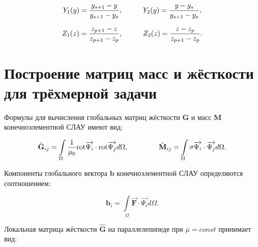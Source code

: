 \begin{equation*} \label{eq_2_38}
	Y_1(y) = \frac{y_{s + 1} - y}{y_{s + 1} - y_s}, \hspace{10mm} Y_2(y) = \frac{y - y_s}{y_{s + 1} - y_s},
\end{equation*}

\begin{equation*} \label{eq_2_39}
	Z_1(z) = \frac{z_{p + 1} - z}{z_{p + 1} - z_p}, \hspace{10mm} Z_2(z) = \frac{z - z_p}{z_{p + 1} - z_p}.
\end{equation*}

\section{Построение матриц масс и жёсткости для трёхмерной задачи}

Формулы для вычисления глобальных матриц жёсткости $\textbf{G}$ и масс $\textbf{M}$ конечноэлементной СЛАУ имеют вид:

\begin{equation*} \label{eq_2_40}
	\hat{\textbf{G}}_{ij} = \int \limits_{\Omega} \frac{1}{\mu_0} \text{rot} \overrightarrow{\textbf{$\Psi_i$}} \cdot \text{rot} \overrightarrow{\textbf{$\Psi_j$}} d \Omega, \hspace{15mm} \hat{\textbf{M}}_{ij} = \int \limits_{\Omega} \sigma \overrightarrow{\textbf{$\Psi_i$}} \cdot \overrightarrow{\textbf{$\Psi_j$}} d \Omega.
\end{equation*}

Компоненты глобального вектора $\textbf{b}$ конечноэлементной СЛАУ определяются соотношением:

\begin{equation*} \label{eq_2_41}
	\textbf{b}_{i} = \int \limits_{\Omega} \overrightarrow{\textbf{F}} \cdot \overrightarrow{\textbf{$\Psi_i$}} d \Omega.
\end{equation*}

Локальная матрица жёсткости $\hat{\textbf{G}}$ на параллелепипеде при $\overline{\mu} = const$ принимает вид:

